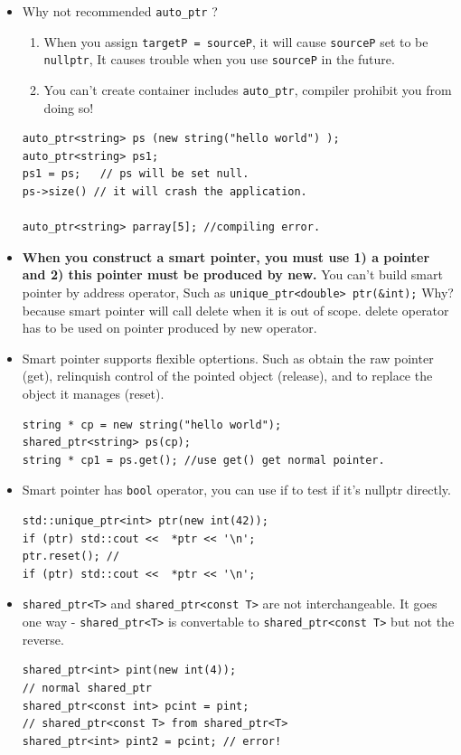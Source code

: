 \documentclass[a4paper,11pt,twoside]{book}
\begin{document}
\begin{itemize}
\item Why not recommended \texttt{auto\_ptr} ? 
\begin{enumerate}
	\item When you assign \texttt{targetP = sourceP}, it will cause \texttt{sourceP} set to be \texttt{nullptr}, It causes trouble when you use \texttt{sourceP} in the future. 
	
	\item You can't create container includes \texttt{auto\_ptr}, compiler prohibit you from doing so!
\end{enumerate}
\begin{lstlisting}[numbers=none]
auto_ptr<string> ps (new string("hello world") );
auto_ptr<string> ps1;
ps1 = ps;   // ps will be set null.
ps->size() // it will crash the application.

auto_ptr<string> parray[5]; //compiling error.
\end{lstlisting}

\item \textbf{When you construct a smart pointer, you must use 1) a pointer and 2) this pointer must be produced by new.} You can't build smart pointer by address operator, Such as \texttt{unique\_ptr<double> ptr(\&int);}   Why? because smart pointer will call delete when it is out of scope.  delete operator has to be used on pointer produced by new operator.

\item Smart pointer supports flexible optertions. Such as obtain the raw pointer (get), relinquish control of the pointed object (release), and to replace the object it manages (reset).
\begin{lstlisting}[numbers=none]
string * cp = new string("hello world");
shared_ptr<string> ps(cp);
string * cp1 = ps.get(); //use get() get normal pointer.
\end{lstlisting}


\item Smart pointer has \texttt{bool} operator, you can use if to test if it's nullptr directly.
\begin{lstlisting}[numbers=none]
std::unique_ptr<int> ptr(new int(42));
if (ptr) std::cout <<  *ptr << '\n';
ptr.reset(); //
if (ptr) std::cout <<  *ptr << '\n';
\end{lstlisting}

\item \texttt{shared\_ptr<T>} and \texttt{shared\_ptr<const T>} are not interchangeable. It goes one way - \texttt{shared\_ptr<T>} is convertable to \texttt{shared\_ptr<const T>} but not the reverse.
\begin{lstlisting}[numbers=none]
shared_ptr<int> pint(new int(4)); 
// normal shared_ptr
shared_ptr<const int> pcint = pint; 
// shared_ptr<const T> from shared_ptr<T>
shared_ptr<int> pint2 = pcint; // error! 
\end{lstlisting}


\end{itemize}
\end{document}
